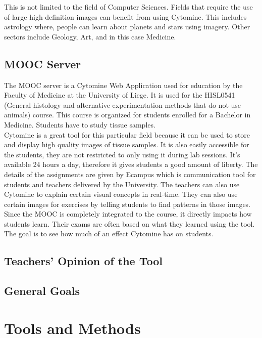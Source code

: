 \documentclass[a4paper,11pt]{report}
\numberwithin{figure}{section} %
\begin{document}
This is not limited to the field of Computer Sciences. Fields that require the use of large high definition images can benefit from using Cytomine. This includes astrology where, people can learn about planets and stars using imagery. Other sectors include Geology, Art, and in this case Medicine.


\subsection{MOOC Server}

The MOOC server is a Cytomine Web Application used for education by the Faculty of Medicine at the University of Liege. It is used for the HISL0541 (General histology and alternative experimentation methods that do not use animals) course. This course is organized for students enrolled for a Bachelor in Medicine. Students have to study tissue samples. \\

Cytomine is a great tool for this particular field because it can be used to store and display high quality images of tissue samples. It is also easily accessible for the students, they are not restricted to only using it during lab sessions. It's available 24 hours a day, therefore it gives students a good amount of liberty. The details of the assignments are given by Ecampus which is communication tool for students and teachers delivered by the University. The teachers can also use Cytomine to explain certain visual concepts in real-time. They can also use certain images for exercises by telling students to find patterns in those images.\\

Since the MOOC is completely integrated to the course, it directly impacts how students learn. Their exams are often based on what they learned using the tool. The goal is to see how much of an effect Cytomine has on students.

\subsection{Teachers' Opinion of the Tool}
\subsection{General Goals}

\section{Tools and Methods}
	
\end{document}
